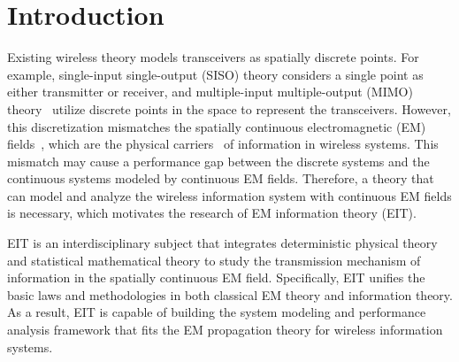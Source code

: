 \documentclass[journal,twocolumn]{IEEEtran}
\begin{document}
\section{Introduction}
Existing wireless theory models transceivers as spatially discrete points. For example, single-input single-output (SISO) theory considers a single point as either  transmitter or receiver, and multiple-input multiple-output (MIMO) theory~\cite{goldsmith2003capacity} utilize discrete points in the space to represent the transceivers. 
However, this discretization mismatches the spatially continuous electromagnetic (EM) fields~\cite{huang2020holographic}, which are the physical carriers~\cite{migliore2018horse} of information in wireless systems. 
This mismatch may cause a performance gap between the discrete systems and the continuous systems modeled by continuous EM fields. 
Therefore, a theory that can model and analyze the wireless information system with continuous EM fields is necessary, which motivates the research of EM information theory (EIT).

EIT is an interdisciplinary subject that integrates deterministic physical theory and statistical mathematical theory to study the transmission mechanism of information in the spatially continuous EM field. 
Specifically, EIT unifies the basic laws and methodologies in both classical EM theory and information theory. 
As a result, EIT is capable of building the system modeling and performance analysis framework that fits the EM propagation theory for wireless information systems. 
\end{document}
